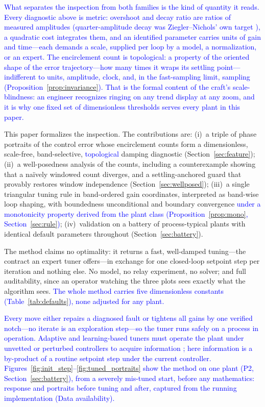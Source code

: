 \documentclass[final,3p,times,twocolumn]{elsarticle}
\newcommand{\revb}[1]{\textcolor{blue}{#1}} %
\newcommand{\revc}[1]{\textcolor{blue}{#1}} %
\newcommand{\revd}[1]{\textcolor{blue}{#1}} %
\newcommand{\revg}[1]{\textcolor{blue}{#1}} %
\newcommand{\revh}[1]{\textcolor{blue}{#1}} %
\begin{document}
\revg{What separates the inspection from both families is the kind of
quantity it reads. Every diagnostic above is metric: overshoot and
decay ratio are ratios of measured amplitudes\revh{ (quarter-amplitude
decay was Ziegler--Nichols' own target \cite{ZN1942})}, a quadratic cost
integrates them, and an identified parameter carries units of gain and
time---each demands a scale, supplied per loop by a model, a
normalization, or an expert. The encirclement count is topological: a
property of the oriented shape of the error trajectory---how many
times it wraps its settling point---indifferent to units, amplitude,
clock, and, in the fast-sampling limit, sampling
(Proposition~\ref{prop:invariance}). That is the formal content of the
craft's scale-blindness: an engineer recognizes ringing on any trend
display at any zoom, and it is why one fixed set of dimensionless
thresholds serves every plant in this paper.}

This paper formalizes the inspection. The contributions are:
(i)~a triple of phase portraits of the control error whose encirclement
counts form a dimensionless, scale-free, band-selective, \revg{topological}
damping diagnostic
(Section~\ref{sec:feature});
(ii)~a well-posedness analysis of the counts, including a counterexample
showing that a na\"ively windowed count diverges, and a settling-anchored
guard that provably restores window independence
(Section~\ref{sec:wellposed});
(iii)~a single triangular tuning rule in band-ordered gain coordinates,
interpreted as band-wise
loop shaping, with boundedness unconditional and boundary convergence
\revb{under a monotonicity property derived from the plant class
(Proposition~\ref{prop:mono}, Section~\ref{sec:rule})};
(iv)~validation on a battery of process-typical plants with identical
default parameters throughout (Section~\ref{sec:battery}).

The method claims no optimality: it returns a fast, well-damped
tuning---the contract an expert tuner offers---in exchange for one
closed-loop setpoint step per iteration and nothing else. No model, no
relay experiment, no solver; and full auditability, since an operator
watching the three plots sees exactly what the algorithm sees.
\revd{The whole method carries five dimensionless constants
(Table~\ref{tab:defaults}), none adjusted for any plant.}

\revc{Every move either repairs a diagnosed fault or tightens all
gains by one verified notch---no iterate is an exploration step---so
the tuner runs safely on a process in operation. Adaptive and
learning-based tuners must operate the plant under unvetted or
perturbed controllers to acquire information
\cite{HjalmarssonIFT,KillingsworthKrstic}; here information is a
by-product of a routine setpoint step under the current controller.
Figures~\ref{fig:init_step}--\ref{fig:tuned_portraits} show the method
on one plant (P2, Section~\ref{sec:battery}), from a severely
mis-tuned start, before any mathematics: response and portraits before
tuning and after, captured from the running implementation (Data
availability).}
\end{document}
